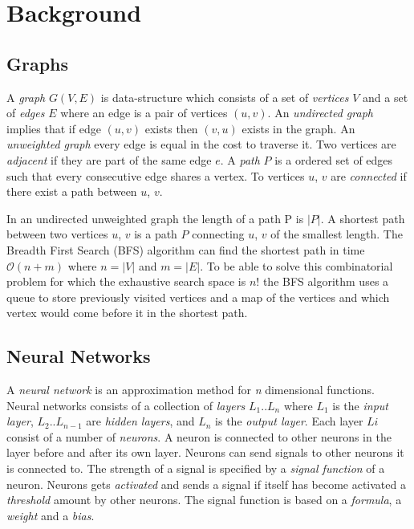 
\section{Background}
\subsection{Graphs}
A \textit{graph} $G(V,E)$ is data-structure which consists of a set of \textit{vertices} $V$ and a set of \textit{edges} $E$ where an edge is a pair of vertices $(u,v)$. An \textit{undirected graph} implies that if edge $ (u,v) $ exists then $ (v,u) $ exists in the graph. An \textit{unweighted graph} every edge is equal in the cost to traverse it.
Two vertices are \textit{adjacent} if they are part of the same edge $ e $. A \textit{path} $ P $ is a ordered set of edges such that every consecutive edge shares a vertex. To vertices $ u $, $ v $ are \textit{connected} if there exist a path between $ u $, $ v $.

\newpar In an undirected unweighted graph the length of a path P is $ |P| $. A shortest path between two vertices  $ u $, $ v $ is a path $ P $ connecting  $ u $, $ v $ of the smallest length. The Breadth First Search (BFS) algorithm can find the shortest path in time $ \mathcal{O}(n+m) $ where $ n=|V| $ and $ m=|E| $. To be able to solve this combinatorial problem for which the exhaustive search space is $ n! $ the BFS algorithm uses a queue to store previously visited vertices and a map of the vertices and which vertex would come before it in the shortest path.


\subsection{Neural Networks}
A \textit{neural network} is an approximation method for \textit{n} dimensional functions. Neural networks consists of a collection of \textit{layers} $L_1 .. L_n$ where $L_1$ is the \textit{input layer}, $L_2 .. L_{n-1}$ are \textit{hidden layers}, and $L_n$ is the \textit{output layer}. Each layer $ Li $ consist of a number of \textit{neurons}. A neuron is connected to other neurons in the layer before and after its own layer. Neurons can send signals to other neurons it is connected to. The strength of a signal is specified by a \textit{signal function} of a neuron. Neurons gets \textit{activated} and sends a signal if itself has become activated a \textit{threshold} amount by other neurons. The signal function is based on a \textit{formula}, a \textit{weight} and a \textit{bias}. 

